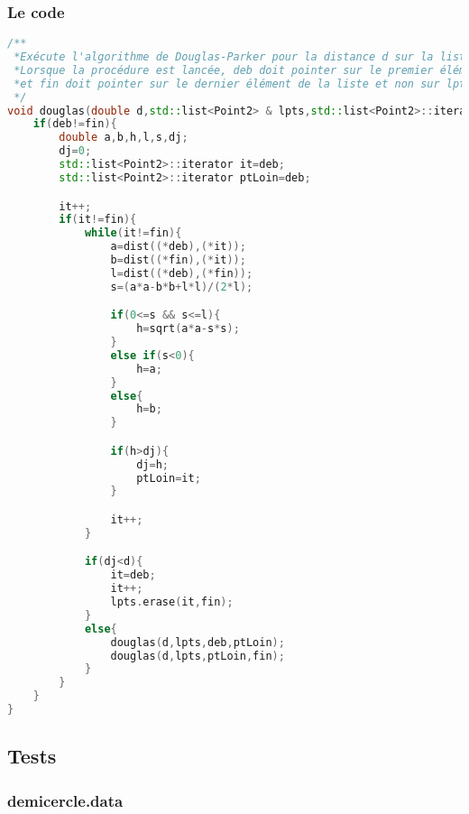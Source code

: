 \documentclass[11pt,a4paper]{article}
\begin{document}
   \subsubsection{Le code}
\begin{lstlisting}[language=c++]
 /**
 *Exécute l'algorithme de Douglas-Parker pour la distance d sur la liste de points lpts.
 *Lorsque la procédure est lancée, deb doit pointer sur le premier élément de la liste,
 *et fin doit pointer sur le dernier élément de la liste et non sur lpts.end().
 */
void douglas(double d,std::list<Point2> & lpts,std::list<Point2>::iterator deb,std::list<Point2>::iterator fin){
    if(deb!=fin){
        double a,b,h,l,s,dj;
        dj=0;
        std::list<Point2>::iterator it=deb;
        std::list<Point2>::iterator ptLoin=deb;

        it++;
        if(it!=fin){
            while(it!=fin){
                a=dist((*deb),(*it));
                b=dist((*fin),(*it));
                l=dist((*deb),(*fin));
                s=(a*a-b*b+l*l)/(2*l);

                if(0<=s && s<=l){
                    h=sqrt(a*a-s*s);
                }
                else if(s<0){
                    h=a;
                }
                else{
                    h=b;
                }

                if(h>dj){
                    dj=h;
                    ptLoin=it;
                }

                it++;
            }

            if(dj<d){
                it=deb;
                it++;
                lpts.erase(it,fin);
            }
            else{
                douglas(d,lpts,deb,ptLoin);
                douglas(d,lpts,ptLoin,fin);
            }
        }
    }
}
\end{lstlisting}


\subsection{Tests}
\subsubsection{demicercle.data}
\end{document}
